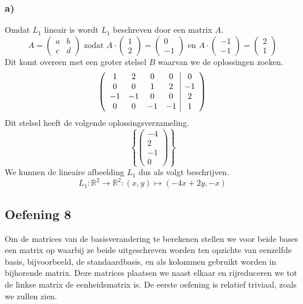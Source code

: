 \documentclass[lineaire_algebra_oplossingen.tex]{subfiles}
\begin{document}
\subsubsection*{a)}
Omdat $L_1$ lineair is wordt $L_1$ beschreven door een matrix $A$.
\[
A = 
\begin{pmatrix}
a & b \\
c & d
\end{pmatrix}
\text{ zodat }
A
\cdot
\begin{pmatrix}1\\2\end{pmatrix}
=\begin{pmatrix}0\\-1\end{pmatrix}
\text{ en }
A
\cdot
\begin{pmatrix}-1\\-1\end{pmatrix}
=\begin{pmatrix}2\\1\end{pmatrix}
\]
Dit komt overeen met een groter stelsel $B$ waarvan we de oplossingen zoeken.
\[
\left(
\begin{array}{c c c c | c}
1 & 2 & 0 & 0 & 0\\
0 & 0 & 1 & 2 & -1\\
-1 & -1 & 0 & 0 & 2\\
0 & 0 & -1 & -1 & 1\\
\end{array}
\right)
\]
Dit stelsel heeft de volgende oplossingsverzameling.
\[
\left\lbrace
\begin{pmatrix}
-4\\2\\-1\\0
\end{pmatrix}
\right\rbrace
\]
We kunnen de lineaire afbeelding $L_1$ dus als volgt beschrijven.
\[
L_1:\mathbb{R}^2\rightarrow\mathbb{R}^2: (x,y)\mapsto (-4x+2y,-x)
\]

\subsection{Oefening 8}
Om de matrices van de basisverandering te berekenen stellen we voor beide bases een matrix op waarbij ze beide uitgeschreven worden ten opzichte van eenzelfde basis, bijvoorbeeld, de standaardbasis, en als kolommen gebruikt worden in bijhorende matrix. Deze matrices plaatsen we naast elkaar en rijreduceren we tot de linkse matrix de eenheidsmatrix is. De eerste oefening is relatief triviaal, zoals we zullen zien.
\end{document}
